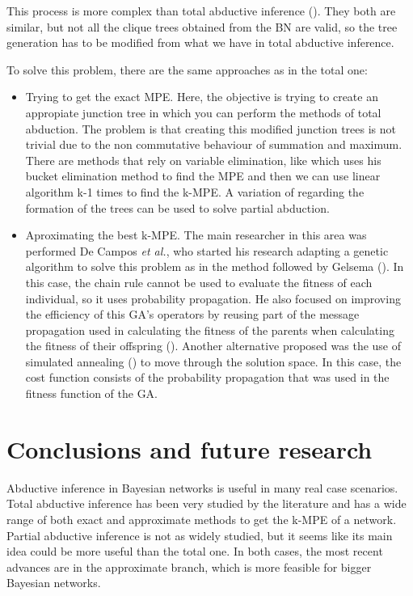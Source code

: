 \documentclass[a4paper,11pt]{article}
\begin{document}
This process is more complex than total abductive inference (\cite{deCampos2002}). They both are similar, but not all the clique trees obtained from the BN are valid, so the tree generation has to be modified from what we have in total abductive inference.

To solve this problem, there are the same approaches as in the total one:

\begin{itemize}

\item Trying to get the exact MPE. Here, the objective is trying to create an appropiate junction tree in which you can perform the methods of total abduction. The problem is that creating this modified junction trees is not trivial due to the non commutative behaviour of summation and maximum. There are methods that rely on variable elimination, like \cite{dechter1998} which uses his bucket elimination method to find the MPE and then we can use \cite{li1993} linear algorithm k-1 times to find the k-MPE. A variation of \cite{nilsson1998} regarding the formation of the trees can be used to solve partial abduction. 

\item Aproximating the best k-MPE. The main researcher in this area was performed De Campos \textit{et al.}, who started his research adapting a genetic algorithm to solve this problem as in the method followed by Gelsema (\cite{deCampos1999}). In this case, the chain rule cannot be used to evaluate the fitness of each individual, so it uses probability propagation. He also focused on improving the efficiency of this GA's operators by reusing part of the message propagation used in calculating the fitness of the parents when calculating the fitness of their offspring (\cite{deCampos2002}). Another alternative proposed was the use of simulated annealing (\cite{deCampos2001}) to move through the solution space. In this case, the cost function consists of the probability propagation that was used in the fitness function of the GA.

\end{itemize}

\section{Conclusions and future research}

Abductive inference in Bayesian networks is useful in many real case scenarios. Total abductive inference has been very studied by the literature and has a wide range of both exact and approximate methods to get the k-MPE of a network. Partial abductive inference is not as widely studied, but it seems like its main idea could be more useful than the total one. In both cases, the most recent advances are in the approximate branch, which is more feasible for bigger Bayesian networks.
\end{document}
